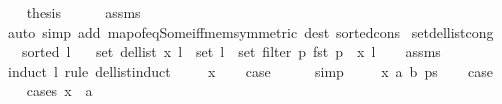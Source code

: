 \begin{isabellebody}
\ \ \isamarkupfalse%
\ {\isacharquery}{\kern0pt}thesis\isanewline
\ \ \ \ \isamarkupfalse%
\ assms\isanewline
\ \ \ \ \isamarkupfalse%
\ {\isacharparenleft}{\kern0pt}auto\ simp\ add{\isacharcolon}{\kern0pt}\ map{\isacharunderscore}{\kern0pt}of{\isacharunderscore}{\kern0pt}eq{\isacharunderscore}{\kern0pt}Some{\isacharunderscore}{\kern0pt}iff{\isacharunderscore}{\kern0pt}mem{\isacharbrackleft}{\kern0pt}symmetric{\isacharbrackright}{\kern0pt}\ dest{\isacharcolon}{\kern0pt}\ sorted{\isacharunderscore}{\kern0pt}cons{\isacharparenright}{\kern0pt}\isanewline
{}\isamarkupfalse%
%
\endisatagproof
{\isafoldproof}%
%
\isadelimproof
\isanewline
%
\endisadelimproof
%
\isadeliminvisible
\isanewline
%
\endisadeliminvisible
%
\isataginvisible
{}\isamarkupfalse%
\ set{\isacharunderscore}{\kern0pt}del{\isacharunderscore}{\kern0pt}list{\isacharunderscore}{\kern0pt}cong{\isacharcolon}{\kern0pt}\isanewline
\ \ \ {\isachardoublequoteopen}sorted{}\ l{\isachardoublequoteclose}\isanewline
\ \ \ {\isachardoublequoteopen}set\ {\isacharparenleft}{\kern0pt}del{\isacharunderscore}{\kern0pt}list\ x\ l{\isacharparenright}{\kern0pt}\ {\isacharequal}{\kern0pt}\ set\ l\ {\isacharminus}{\kern0pt}\ set\ {\isacharparenleft}{\kern0pt}filter\ {\isacharparenleft}{\kern0pt}{\isasymlambda}p{\isachardot}{\kern0pt}\ fst\ p\ {\isacharequal}{\kern0pt}\ x{\isacharparenright}{\kern0pt}\ l{\isacharparenright}{\kern0pt}{\isachardoublequoteclose}%
\endisataginvisible
{\isafoldinvisible}%
%
\isadeliminvisible
\isanewline
%
\endisadeliminvisible
%
\isadelimproof
\ \ %
\endisadelimproof
%
\isatagproof
{}\isamarkupfalse%
\ assms\isanewline
{}\isamarkupfalse%
\ {\isacharparenleft}{\kern0pt}induct\ l\ rule{\isacharcolon}{\kern0pt}\ del{\isacharunderscore}{\kern0pt}list{\isachardot}{\kern0pt}induct{\isacharparenright}{\kern0pt}\isanewline
\ \ \isamarkupfalse%
\ {\isacharparenleft}{\kern0pt}{}\ x{\isacharparenright}{\kern0pt}\isanewline
\ \ \isamarkupfalse%
\ {\isacharquery}{\kern0pt}case\isanewline
\ \ \ \ \isamarkupfalse%
\ simp\isanewline
{}\isamarkupfalse%
\isanewline
\ \ \isamarkupfalse%
\ {\isacharparenleft}{\kern0pt}{}\ x\ a\ b\ ps{\isacharparenright}{\kern0pt}\isanewline
\ \ \isamarkupfalse%
\ {\isacharquery}{\kern0pt}case\isanewline
\ \ \isamarkupfalse%
\ {\isacharparenleft}{\kern0pt}cases\ {\isachardoublequoteopen}x\ {\isacharequal}{\kern0pt}\ a{\isachardoublequoteclose}{\isacharparenright}{\kern0pt}\isanewline

\end{isabellebody}
